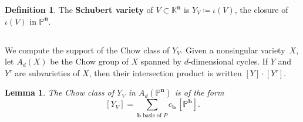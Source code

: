 \documentclass[11pt]{article}
\newtheorem{lemm}[theo]{Lemma}
\theoremstyle{definition}
\newtheorem{defi}[theo]{Definition}
\numberwithin{equation}{section}
\renewcommand{\P}{\mathbb{P}}
\newcommand{\K}{\mathbb{K}}
\newcommand{\word}[1]{\textbf{#1}}
\begin{document}
\begin{defi}
  The \word{Schubert variety} of $V \subset \K^{\mathbf n}$ is $Y_V \coloneqq \overline{\iota(V)}$, the closure of $\iota(V)$ in $\P^{\mathbf n}$.
\end{defi}

\subsection{}\label{chowclass}
We compute the support of the Chow class of $Y_V$.
Given a nonsingular variety~$X$, let $A_d(X)$ be the Chow group of $X$ spanned by $d$-dimensional cycles.
If $Y$ and $Y'$ are subvarieties of $X$, then their intersection product is written $[Y] \cdot [Y']$.
\begin{lemm}\label{chowbases}
  The Chow class of $Y_V$ in $A_d(\P^{\mathbf n})$ is of the form
  \[
    [Y_V] = \sum_{\mathbf b \text{ basis of $P$}} c_{\mathbf b}\, [\P^{\mathbf b}].
  \]
\end{lemm}
\end{document}
